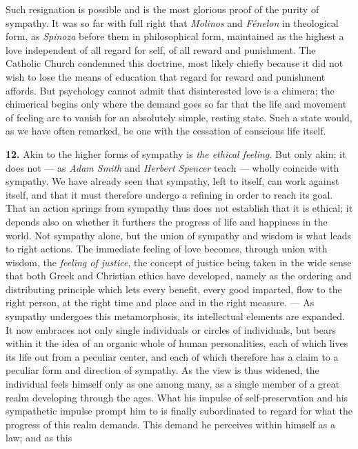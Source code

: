 \documentclass[12pt,a4paper]{book}
\newcommand{\opage}[1]{\marginnote{\footnotesize\textit{[#1]}}}
\begin{document}
Such resignation is possible and is the most glorious proof of the
purity of sympathy. It was so far with full right that \emph{Molinos}
and \emph{Fénelon} in theological form, as \emph{Spinoza} before them in
philosophical form, maintained as the highest a love independent of all
regard for self, of all reward and punishment. The Catholic Church
condemned this doctrine, most likely chiefly because it did not wish to
lose the means of education that regard for reward and punishment
affords. But psychology cannot admit that disinterested love is a
chimera; the chimerical begins only where the demand goes so far that
the life and movement of feeling are to vanish for an absolutely simple,
resting state. Such a state would, as we have often remarked, be one
with the cessation of conscious life itself.

\textbf{12.} Akin to the higher forms of sympathy is \emph{the ethical
feeling}. But only akin; it does not ---
\opage{310}as \emph{Adam Smith} and \emph{Herbert Spencer} teach ---
wholly coincide with sympathy. We have already seen that sympathy, left
to itself, can work against itself, and that it must therefore undergo a
refining in order to reach its goal. That an action springs from
sympathy thus does not establish that it is ethical; it depends also on
whether it furthers the progress of life and happiness in the world. Not
sympathy alone, but the union of sympathy and wisdom is what leads to
right actions. The immediate feeling of love becomes, through union with
wisdom, the \emph{feeling of justice}, the concept of justice being taken
in the wide sense that both Greek and Christian ethics have developed,
namely as the ordering and distributing principle which lets every
benefit, every good imparted, flow to the right person, at the right
time and place and in the right measure. --- As sympathy undergoes this
metamorphosis, its intellectual elements are expanded. It now embraces
not only single individuals or circles of individuals, but bears within
it the idea of an organic whole of human personalities, each of which
lives its life out from a peculiar center, and each of which therefore
has a claim to a peculiar form and direction of sympathy. As the view is
thus widened, the individual feels himself only as one among many, as a
single member of a great realm developing through the ages. What his
impulse of self-preservation and his sympathetic impulse prompt him to
is finally subordinated to regard for what the progress of this realm
demands. This demand he perceives within himself as a law; and as this
\end{document}
